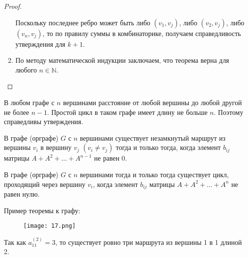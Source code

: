\begin{proof}
\begin{enumerate}[left=0.0em, labelsep=1em, topsep=0.0em, itemsep=0pt, parsep=0.5em]
        Поскольку последнее ребро может быть либо $(v_1, v_j)$, либо $(v_2, v_j)$,
        либо $(v_n, v_j)$, то по правилу суммы в комбинаторике, получаем
        справедливость утверждения для $k + 1$.

        \item По методу математической индукции заключаем, что теорема верна
        для любого $n \in \mathbb{N}$.
    \end{enumerate}
\end{proof}

\newpage
В любом графе с $n$ вершинами расстояние от любой вершины до любой
другой не более $n-1$. Простой цикл в таком графе имеет длину не больше $n$.
Поэтому справедливы утверждения.

В графе (орграфе) $G$ с $n$ вершинами существует незамкнутый
маршрут из вершины $v_i$ в вершину $v_j$ $(v_i \neq v_j)$ тогда и только тогда, когда
элемент $b_{ij}$ матрицы $A + A^2 + \dots + A^{n-1}$ не равен 0.

В графе (орграфе) $G$ с $n$ вершинами тогда и только тогда
существует цикл, проходящий через вершину $v_i$, когда элемент $b_{ij}$ матрицы
$A + A^2 + \dots + A^n$ не равен нулю.

Пример теоремы к графу:
\begin{figure}[h]
    \centering
    \texttt{[image: 17.png]}
\end{figure}

Так как $a_{11}^{(2)}=3$, то существует ровно три маршрута из вершины
1 в 1 длиной 2.